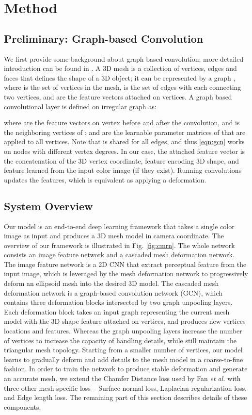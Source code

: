 \documentclass[runningheads]{llncs}
\def\etal{\emph{et al.}}
\newcommand{\figref}[1]{Fig. \ref{#1}}
\begin{document}
\section{Method}

\subsection{Preliminary: Graph-based Convolution}
We first provide some background about graph based convolution; more detailed introduction can be found in \cite{BronsteinBLSV17}.
A 3D mesh is a collection of vertices, edges and faces that defines the shape of a 3D object; it can be represented by a graph , where  is the set of  vertices in the mesh,  is the set of  edges with each connecting two vertices, and  are the feature vectors attached on vertices.
A graph based convolutional layer is defined on irregular graph as: 

where  are the feature vectors on vertex  before and after the convolution, and  is the neighboring vertices of ;  and  are the learnable parameter matrices of  that are applied to all vertices. Note that  is shared for all edges, and thus \eqref{eqn:gcn} works on nodes with different vertex degrees.
In our case, the attached feature vector  is the concatenation of the 3D vertex coordinate, feature encoding 3D shape, and feature learned from the input color image (if they exist).
Running convolutions updates the features, which is equivalent as applying a deformation.

\subsection{System Overview}
\label{sec:overiew}
Our model is an end-to-end deep learning framework that takes a single color image as input and produces a 3D mesh model in camera coordinate. The overview of our framework is illustrated in \figref{fig:cmrn}. 
The whole network consists an image feature network and a cascaded mesh deformation network.
The image feature network is a 2D CNN that extract perceptual feature from the input image, which is leveraged by the mesh deformation network to progressively deform an ellipsoid mesh into the desired 3D model.
The cascaded mesh deformation network is a graph-based convolution network (GCN), which contains three deformation blocks intersected by two graph unpooling layers.
Each deformation block takes an input graph representing the current mesh model with the 3D shape feature attached on vertices, and produces new vertices locations and features.
Whereas the graph unpooling layers increase the number of vertices to increase the capacity of handling details, while still maintain the triangular mesh topology.
Starting from a smaller number of vertices, our model learns to gradually deform and add details to the mesh model in a coarse-to-fine fashion.
In order to train the network to produce stable deformation and generate an accurate mesh, we extend the Chamfer Distance loss used by Fan \etal \cite{FanSG16} with three other mesh specific loss -- Surface normal loss, Laplacian regularization loss, and Edge length loss.
The remaining part of this section describes details of these components.
\end{document}
